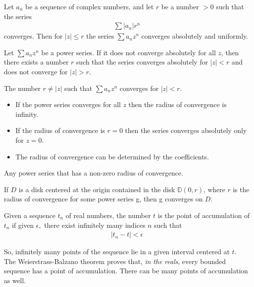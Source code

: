 \begin{thm}
  Let $a_n$ be a sequence of complex numbers, and let $r$ be a number $> 0$ such that the series 
  \begin{align*}
    \sum | a_n | r^n
  \end{align*}
  converges. Then for $|z| \leq r$ the series $\sum a_n z^n$ converges absolutely and uniformly. 
\end{thm}

\begin{thm}
  Let $\sum a_n z^n$ be a power series. If it does not converge absolutely for all $z$, then 
  there exists a number $r$ such that the series converges absolutely for $|z| < r$ and does not 
  converge for $|z| > r.$
\end{thm}

\begin{defn}
  The number $r \not = |z|$ such that  $\sum a_n z^n$ converges for $|z| < r.$
  \begin{itemize}
    \item If the power series converges for all $z$ then the radius of convergence is infinity.
    \item If the radius of convergence is $r = 0$ then the series converges absolutely only for $z = 0.$
    \item The radius of convergence can be determined by the coefficients.
  \end{itemize}
\end{defn}

\begin{defn}
  Any power series that has a non-zero radius of convergence.
\end{defn}

\begin{defn}
  If $D$ is a disk centered at the origin contained in the disk $\mathbb{D}(0, r)$, where $r$ is the 
  radius of convergence for some power series g, then g converges on $D.$ 
\end{defn}

\begin{defn}
  Given a sequence $t_n$ of real numbers, the number $t$ is the point of accumulation of $t_n$ if 
  given $\epsilon,$ there exist infinitely many indices $n$ such that
  \begin{align*}
    |t_n - t| < \epsilon
  \end{align*}
\end{defn}
So, infinitely many points of the sequence lie in a given interval centered at $t.$ The Weierstrass-Balzano
theorem proves that, \emph{in the reals}, every bounded sequence has a point of accumulation. There can 
be many points of accumulation as well.

